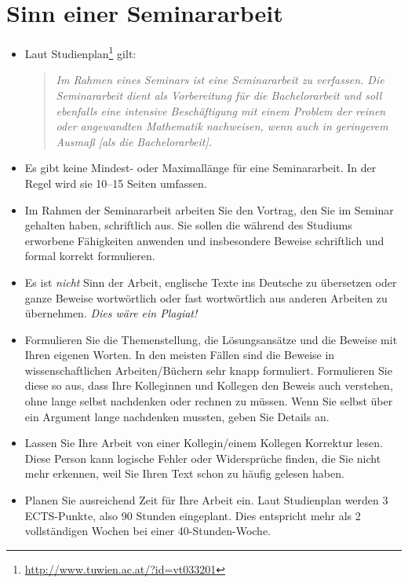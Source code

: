 \chapter{Sinn einer Seminararbeit}
\label{chapter:sinnfrage}

\begin{itemize}

\item Laut Studienplan\footnote{\href{http://www.tuwien.ac.at/?id=vt033201}{\ttfamily http://www.tuwien.ac.at/?id=vt033201}}
gilt:
\begin{quote}\itshape
Im Rahmen eines Seminars ist eine Seminararbeit zu verfassen. Die Seminararbeit dient als Vorbereitung für die Bachelorarbeit und soll ebenfalls eine intensive Beschäftigung mit einem Problem der reinen oder angewandten Mathematik nachweisen, wenn auch in geringerem Ausmaß [als die Bachelorarbeit].
\end{quote}

\item Es gibt keine Mindest- oder Maximallänge für eine Seminararbeit. In der Regel wird sie 10--15 Seiten umfassen.

\item Im Rahmen der Seminararbeit arbeiten Sie den Vortrag, den Sie im Seminar gehalten haben, schriftlich aus. 
Sie sollen die während des Studiums erworbene Fähigkeiten anwenden und insbesondere Beweise schriftlich und formal korrekt formulieren. 

\item Es ist {\em nicht} Sinn der Arbeit, englische Texte ins Deutsche zu übersetzen oder ganze
Beweise wortwörtlich oder fast wortwörtlich aus anderen Arbeiten zu übernehmen. {\em Dies wäre ein Plagiat!} 

\item Formulieren Sie die Themenstellung, die Lösungsansätze und die Beweise 
mit Ihren eigenen Worten. In den meisten Fällen sind die Beweise
in wissenschaftlichen Arbeiten/Büchern sehr knapp formuliert. Formulieren Sie diese so
aus, dass Ihre Kolleginnen und Kollegen den Beweis auch verstehen, ohne lange selbst nachdenken
oder rechnen zu müssen. Wenn Sie selbst über ein Argument lange nachdenken mussten,
geben Sie Details an.

\item Lassen Sie Ihre Arbeit von einer Kollegin/einem Kollegen Korrektur lesen.
Diese Person kann logische Fehler oder Widersprüche finden, die Sie nicht mehr
erkennen, weil Sie Ihren Text schon zu häufig gelesen haben.

\item Planen Sie ausreichend Zeit für Ihre Arbeit ein. Laut Studienplan
werden 3 ECTS-Punkte, also 90 Stunden eingeplant. Dies entspricht mehr
als 2 vollständigen Wochen bei einer 40-Stunden-Woche. 

\end{itemize}